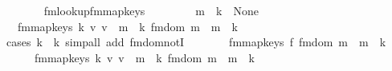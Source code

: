 \begin{isabellebody}
\ \ \ \ \ \ \isamarkupfalse%
\ fmlookup{\isacharunderscore}{\kern0pt}fmmap{\isacharunderscore}{\kern0pt}keys\ \isacommand{{\isachardot}{\kern0pt}}\isamarkupfalse%
\isanewline
\ \ \ \ \isamarkupfalse%
\ \isamarkupfalse%
\ {\isacartoucheopen}m\ {\isachardollar}{\kern0pt}{\isachardollar}{\kern0pt}\ k\ {\isacharequal}{\kern0pt}\ None{\isacartoucheclose}\ \isamarkupfalse%
\ {\isachardoublequoteopen}{\isasymdots}\ {\isacharequal}{\kern0pt}\ fmmap{\isacharunderscore}{\kern0pt}keys\ {\isacharparenleft}{\kern0pt}{\isasymlambda}k{\isacharprime}{\kern0pt}\ v{\isacharprime}{\kern0pt}{\isachardot}{\kern0pt}\ v{\isacharprime}{\kern0pt}\ {\isacharplus}{\kern0pt}\ m\ {\isachardollar}{\kern0pt}{\isachardollar}{\kern0pt}{\isacharbang}{\kern0pt}\ k{\isacharprime}{\kern0pt}{\isacharparenright}{\kern0pt}\ {\isacharparenleft}{\kern0pt}fmdom{\isacharprime}{\kern0pt}\ m\ {\isasymlhd}\ m\ {\isachardollar}{\kern0pt}{\isachardollar}{\kern0pt}\ k{\isacharprime}{\kern0pt}{\isachardoublequoteclose}\isanewline
\ \ \ \ \ \ \isamarkupfalse%
\ {\isacharparenleft}{\kern0pt}cases\ {\isachardoublequoteopen}k{\isacharprime}{\kern0pt}\ {\isacharequal}{\kern0pt}\ k{\isachardoublequoteclose}{\isacharparenright}{\kern0pt}\ {\isacharparenleft}{\kern0pt}simp{\isacharunderscore}{\kern0pt}all\ add{\isacharcolon}{\kern0pt}\ fmdom{\isacharprime}{\kern0pt}{\isacharunderscore}{\kern0pt}notI{\isacharparenright}{\kern0pt}\isanewline
\ \ \ \ \isamarkupfalse%
\ \isamarkupfalse%
\ {\isachardoublequoteopen}fmmap{\isacharunderscore}{\kern0pt}keys\ {\isacharquery}{\kern0pt}f\ {\isacharparenleft}{\kern0pt}fmdom{\isacharprime}{\kern0pt}\ m\ {\isasymlhd}\ m\ {\isachardollar}{\kern0pt}{\isachardollar}{\kern0pt}\ k{\isacharprime}{\kern0pt}\ {\isacharequal}{\kern0pt}\isanewline
\ \ \ \ \ \ fmmap{\isacharunderscore}{\kern0pt}keys\ {\isacharparenleft}{\kern0pt}{\isasymlambda}k{\isacharprime}{\kern0pt}\ v{\isacharprime}{\kern0pt}{\isachardot}{\kern0pt}\ v{\isacharprime}{\kern0pt}\ {\isacharplus}{\kern0pt}\ m\ {\isachardollar}{\kern0pt}{\isachardollar}{\kern0pt}{\isacharbang}{\kern0pt}\ k{\isacharprime}{\kern0pt}{\isacharparenright}{\kern0pt}\ {\isacharparenleft}{\kern0pt}fmdom{\isacharprime}{\kern0pt}\ m\ {\isasymlhd}\ m\ {\isachardollar}{\kern0pt}{\isachardollar}{\kern0pt}\ k{\isacharprime}{\kern0pt}{\isachardoublequoteclose}\ \isacommand{{\isachardot}{\kern0pt}}\isamarkupfalse%

\end{isabellebody}
